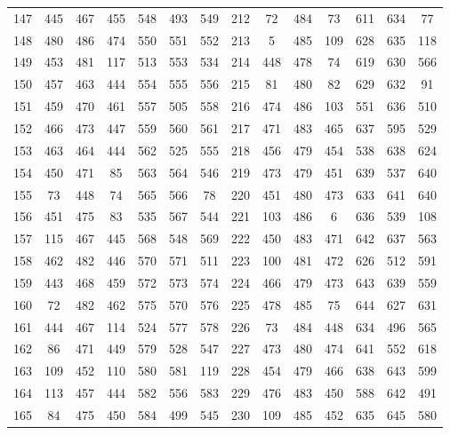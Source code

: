 \begin{apendicesenv}
\begin{table}[H]
\begin{tabular}{@{}ccccccc@{\hspace{1.0cm}}ccccccc@{}}
		147 &  445 &  467 &  455 &  548 &  493 &  549 & 212 &   72 &  484 &   73 &  611 &  634 &   77 \\
		148 &  480 &  486 &  474 &  550 &  551 &  552 & 213 &    5 &  485 &  109 &  628 &  635 &  118 \\
		149 &  453 &  481 &  117 &  513 &  553 &  534 & 214 &  448 &  478 &   74 &  619 &  630 &  566 \\
		150 &  457 &  463 &  444 &  554 &  555 &  556 & 215 &   81 &  480 &   82 &  629 &  632 &   91 \\
		151 &  459 &  470 &  461 &  557 &  505 &  558 & 216 &  474 &  486 &  103 &  551 &  636 &  510 \\
		152 &  466 &  473 &  447 &  559 &  560 &  561 & 217 &  471 &  483 &  465 &  637 &  595 &  529 \\
		153 &  463 &  464 &  444 &  562 &  525 &  555 & 218 &  456 &  479 &  454 &  538 &  638 &  624 \\
		154 &  450 &  471 &   85 &  563 &  564 &  546 & 219 &  473 &  479 &  451 &  639 &  537 &  640 \\
		155 &   73 &  448 &   74 &  565 &  566 &   78 & 220 &  451 &  480 &  473 &  633 &  641 &  640 \\
		156 &  451 &  475 &   83 &  535 &  567 &  544 & 221 &  103 &  486 &    6 &  636 &  539 &  108 \\
		157 &  115 &  467 &  445 &  568 &  548 &  569 & 222 &  450 &  483 &  471 &  642 &  637 &  563 \\
		158 &  462 &  482 &  446 &  570 &  571 &  511 & 223 &  100 &  481 &  472 &  626 &  512 &  591 \\
		159 &  443 &  468 &  459 &  572 &  573 &  574 & 224 &  466 &  479 &  473 &  643 &  639 &  559 \\
		160 &   72 &  482 &  462 &  575 &  570 &  576 & 225 &  478 &  485 &   75 &  644 &  627 &  631 \\
		161 &  444 &  467 &  114 &  524 &  577 &  578 & 226 &   73 &  484 &  448 &  634 &  496 &  565 \\
		162 &   86 &  471 &  449 &  579 &  528 &  547 & 227 &  473 &  480 &  474 &  641 &  552 &  618 \\
		163 &  109 &  452 &  110 &  580 &  581 &  119 & 228 &  454 &  479 &  466 &  638 &  643 &  599 \\
		164 &  113 &  457 &  444 &  582 &  556 &  583 & 229 &  476 &  483 &  450 &  588 &  642 &  491 \\
		165 &   84 &  475 &  450 &  584 &  499 &  545 & 230 &  109 &  485 &  452 &  635 &  645 &  580 \\

\end{tabular}
\end{table}
\end{apendicesenv}
